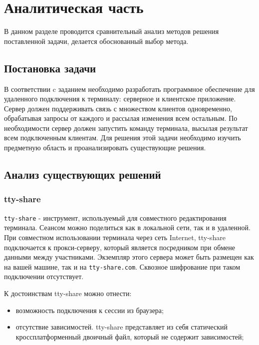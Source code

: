 \chapter{Аналитическая часть}

В данном разделе проводится сравнительный анализ методов решения
поставленной задачи, делается обоснованный выбор метода.

\section{Постановка задачи}

В соответствии c заданием необходимо разработать программное обеспечение для удаленного подключения к терминалу: серверное и клиентское приложение. Сервер должен поддерживать связь с множеством клиентов одновременно, обрабатывая запросы от каждого и рассылая изменения всем остальным. По необходимости сервер должен запустить команду терминала, высылая результат всем подключенным клиентам. Для решения этой задачи необходимо изучить предметную область и проанализировать существующие решения.

\section{Анализ существующих решений}

\subsection{tty-share}

\texttt{tty-share} \cite{tty-share} - инструмент, используемый для совместного редактирования терминала. Сеансом можно поделиться как в локальной сети, так и в удаленной. При совместном использовании терминала через сеть Internet, tty-share подключается к прокси-серверу, который является посредником при обмене данными между участниками. Экземпляр этого сервера может быть размещен как на вашей машине, так и на \texttt{tty-share.com}. Сквозное шифрование при таком подключении отсутствует.

К достоинствам tty-share можно отнести:
\begin{itemize}
	\item возможность подключения к сессии из браузера;
	\item отсутствие зависимостей. tty-share представляет из себя статический кроссплатформенный двоичный файл, который не содержит зависимостей;
\end{itemize}

